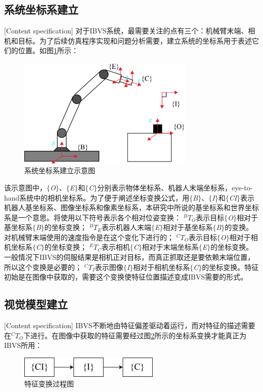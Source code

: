 \documentclass[fontset=fandol,type=bachelor,campus=harbin,bsmainpagenumberline=true]{hithesisbook}
\begin{document}
\subsection{系统坐标系建立}[Content specification]
对于IBVS系统，最需要关注的点有三个：机械臂末端、相机和目标。为了后续仿真程序实现和问题分析需要，建立系统的坐标系用于表述它们的位置。如图\ref{系统坐标系建立}所示：
\begin{figure}[h]
\centering
\includegraphics[width = 0.75\textwidth]{chapter2/系统坐标系建立}
\caption{系统坐标系建立示意图}
\label{系统坐标系建立}
\end{figure}

该示意图中，$\lbrace$\textit{O}$\rbrace$、$\lbrace$\textit{E}$\rbrace$和$\lbrace$\textit{C}$\rbrace$分别表示物体坐标系、机器人末端坐标系，eye-to-hand系统中的相机坐标系。为了便于阐述坐标变换公式，用$\lbrace$\textit{B}$\rbrace$、$\lbrace$\textit{I}$\rbrace$和$\lbrace$\textit{CI}$\rbrace$表示机器人基坐标系、图像坐标系和像素坐标系，本研究中所说的基坐标系和世界坐标系是一个意思。将使用以下符号表示各个相对位姿变换：
$^{B}T_O$表示目标$\lbrace$\textit{O}$\rbrace$相对于基坐标系$\lbrace$\textit{B}$\rbrace$的坐标变换；
$^{B}T_E$表示机器人末端$\lbrace$\textit{E}$\rbrace$相对于基坐标系$\lbrace$\textit{B}$\rbrace$的变换。对机械臂末端使用的速度指令是在这个变化下进行的；
$^{C}T_O$表示目标$\lbrace$\textit{O}$\rbrace$相对于相机坐标系$\lbrace$\textit{C}$\rbrace$的坐标变换；
$^{E}T_C$表示相机$\lbrace$\textit{C}$\rbrace$相对于末端坐标系$\lbrace$\textit{E}$\rbrace$的坐标变换。一般情况下IBVS的伺服结果是相机正对目标，而真正抓取还是要依赖末端位置，所以这个变换是必要的；
$^{C}T_I$表示图像$\lbrace$\textit{I}$\rbrace$相对于相机坐标系$\lbrace$\textit{C}$\rbrace$的坐标变换。特征初始是在图像中获取的，需要这个变换使特征位置描述变成IBVS需要的形式\cite{zh1}。


\subsection{视觉模型建立}[Content specification]
IBVS不断地由特征偏差驱动着运行，而对特征的描述需要在$^{C}T_O$下进行。在图像中获取的特征需要经过图\ref{特征变换}所示的坐标系变换才能真正为IBVS所用：
\begin{figure}[h]
\centering
\includegraphics[width = 0.60\textwidth]{chapter2/特征变换}
\caption{特征变换过程图}
\label{特征变换}
\end{figure}
\end{document}
